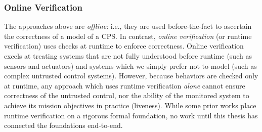 \documentclass[12pt]{cmuthesis}
\theoremstyle{definition}
\theoremstyle{remark}
\begin{document}
\subsubsection{Online Verification}
The approaches above are \emph{offline}: i.e., they are used before-the-fact to ascertain the correctness of a model of a CPS.
In contrast, \emph{online verification} (or runtime verification) uses checks at runtime to enforce correctness.
Online verification excels at treating systems that are not fully understood before runtime (such as sensors and actuators) and systems which we simply prefer not to model (such as complex untrusted control systems).
However, because behaviors are checked only at runtime, any approach which uses runtime verification \emph{alone} cannot ensure correctness of the untrusted control, nor the ability of the monitored system to achieve its mission objectives in practice (liveness).
While some prior works place runtime verification on a rigorous formal foundation, no work until this thesis has connected the foundations end-to-end.
\end{document}
